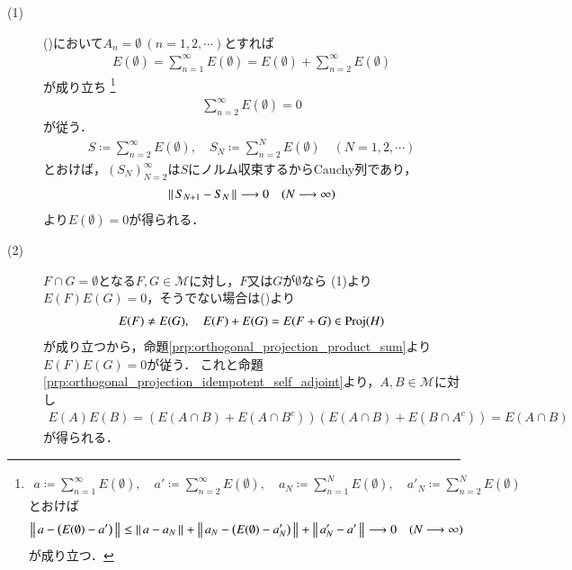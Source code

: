 	\begin{prf}\mbox{}
		\begin{description}
			\item[(1)] ()において$A_n = \emptyset\ (n=1,2,\cdots)$とすれば
				\begin{align}
					E(\emptyset) = \sum_{n=1}^{\infty} E(\emptyset) = E(\emptyset) + \sum_{n=2}^{\infty} E(\emptyset)
				\end{align}
				が成り立ち
				\footnote{
					\begin{align}
						a \coloneqq \sum_{n=1}^{\infty} E(\emptyset),\quad a' \coloneqq \sum_{n=2}^{\infty} E(\emptyset),
						\quad a_N \coloneqq \sum_{n=1}^{N} E(\emptyset),\quad a'_N \coloneqq \sum_{n=2}^{N} E(\emptyset)
					\end{align}
					とおけば
					\begin{align}
						\left\|\, a - \left( E(\emptyset) - a' \right)\, \right\|_{}
						\leq \left\|\, a - a_N\, \right\|_{} + \left\|\, a_N - \left( E(\emptyset) - a'_N \right)\, \right\|_{} + \left\|\, a'_N - a'\, \right\|_{}
						\longrightarrow 0 \quad (N \longrightarrow \infty)
					\end{align}
					が成り立つ．
				}
				\begin{align}
					\sum_{n=2}^{\infty} E(\emptyset) = 0
				\end{align}
				が従う．
				\begin{align}
					S \coloneqq \sum_{n=2}^{\infty} E(\emptyset),
					\quad S_N \coloneqq \sum_{n=2}^{N} E(\emptyset) \quad (N=1,2,\cdots)
				\end{align}
				とおけば，$(S_N)_{N=2}^{\infty}$は$S$にノルム収束するからCauchy列であり，
				\begin{align}
					\left\|\, S_{N+1} - S_{N}\, \right\|_{} \longrightarrow 0 \quad (N \longrightarrow \infty)
				\end{align}
				より$E(\emptyset) = 0$が得られる．
			
			\item[(2)]
				$F \cap G = \emptyset$となる$F,G \in \mathcal{M}$に対し，$F$又は$G$が$\emptyset$なら
				(1)より$E(F)E(G) = 0$，そうでない場合は()より
				\begin{align}
					E(F) \neq E(G), \quad E(F) + E(G) = E(F + G) \in \mathrm{Proj}( H )
				\end{align}
				が成り立つから，命題\ref{prp:orthogonal_projection_product_sum}より$E(F)E(G) = 0$が従う．
				これと命題\ref{prp:orthogonal_projection_idempotent_self_adjoint}より，$A,B \in \mathcal{M}$に対し
				\begin{align}
					E(A)E(B) = \left( E(A \cap B) + E(A \cap B^c) \right)\left( E(A \cap B) + E(B \cap A^c) \right) = E(A \cap B)
				\end{align}
				が得られる．
				\QED
		\end{description}
	\end{prf}
	
